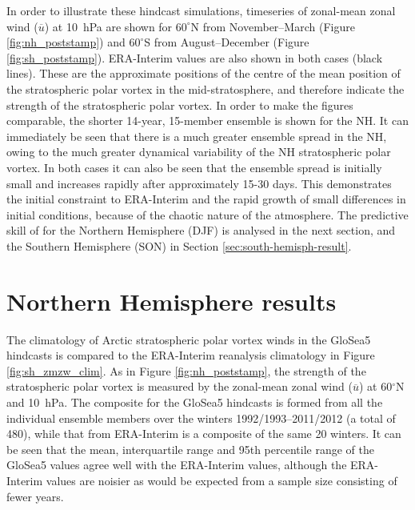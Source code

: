 In order to illustrate these hindcast simulations, timeseries of zonal-mean
zonal wind ($\overline{u}$) at 10~hPa are shown for $60^{\circ}$N from
November--March (Figure \ref{fig:nh_poststamp}) and $60^{\circ}$S from
August--December (Figure \ref{fig:sh_poststamp}). ERA-Interim values are also
shown in both cases (black lines). These are the approximate positions of the
centre of the mean position of the stratospheric polar vortex in the
mid-stratosphere, and therefore indicate the strength of the stratospheric polar
vortex. In order to make the figures comparable, the shorter 14-year, 15-member
ensemble is shown for the NH. It can immediately be seen that there is a much
greater ensemble spread in the NH, owing to the much greater dynamical
variability of the NH stratospheric polar vortex. In both cases it can also be
seen that the ensemble spread is initially small and increases rapidly after
approximately 15-30 days. This demonstrates the initial constraint to
ERA-Interim and the rapid growth of small differences in initial conditions,
because of the chaotic nature of the atmosphere. The predictive skill of for the
Northern Hemisphere (DJF) is analysed in the next section, and the Southern
Hemisphere (SON) in Section \ref{sec:south-hemisph-result}.


\section{Northern Hemisphere results}
\label{sec:north-hemisph-result}

The climatology of Arctic stratospheric polar vortex winds in the GloSea5
hindcasts is compared to the ERA-Interim reanalysis climatology in Figure
\ref{fig:sh_zmzw_clim}. As in Figure \ref{fig:nh_poststamp}, the strength of the
stratospheric polar vortex is measured by the zonal-mean zonal wind
($\overline{u}$) at 60$^{\circ}$N and 10~hPa. The composite for the GloSea5
hindcasts is formed from all the individual ensemble members over the winters
1992/1993--2011/2012 (a total of 480), while that from ERA-Interim is a
composite of the same 20 winters. It can be seen that the mean, interquartile
range and 95th percentile range of the GloSea5 values agree well with the
ERA-Interim values, although the ERA-Interim values are noisier as would be
expected from a sample size consisting of fewer years.

